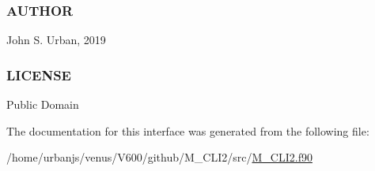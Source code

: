 \subsubsection*{A\+U\+T\+H\+OR}

John S. Urban, 2019 \subsubsection*{L\+I\+C\+E\+N\+SE}

Public Domain 

The documentation for this interface was generated from the following file\+:\begin{DoxyCompactItemize}
\item 
/home/urbanjs/venus/\+V600/github/\+M\+\_\+\+C\+L\+I2/src/\mbox{\hyperlink{M__CLI2_8f90}{M\+\_\+\+C\+L\+I2.\+f90}}\end{DoxyCompactItemize}

